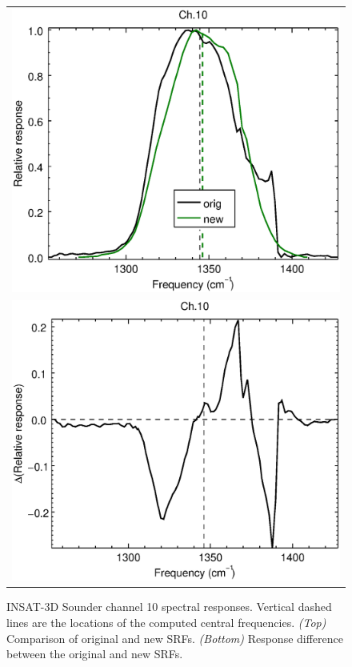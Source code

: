 \begin{figure}[H]
  \centering
  \begin{tabular}{c}
    \includegraphics[scale=0.55]{graphics/sndr/srf/sndr_insat3d-10.eps} \\
    \includegraphics[scale=0.55]{graphics/sndr/srf/sndr_insat3d-10.difference.eps}
  \end{tabular}
  \caption{INSAT-3D Sounder channel 10 spectral responses. Vertical dashed lines are the locations of the computed central frequencies. \emph{(Top)} Comparison of original and new SRFs. \emph{(Bottom)} Response difference between the original and new SRFs.}
  \label{fig:sndr_ch10}
\end{figure}


